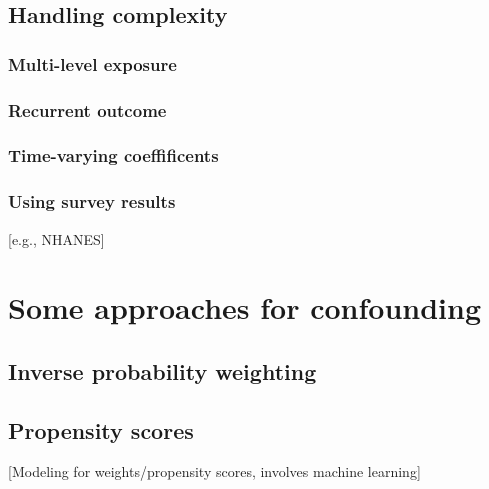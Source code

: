 \documentclass[
]{book}
\begin{document}
\hypertarget{handling-complexity}{%
\section{Handling complexity}\label{handling-complexity}}

\hypertarget{multi-level-exposure}{%
\subsection{Multi-level exposure}\label{multi-level-exposure}}

\hypertarget{recurrent-outcome}{%
\subsection{Recurrent outcome}\label{recurrent-outcome}}

\hypertarget{time-varying-coeffificents}{%
\subsection{Time-varying coeffificents}\label{time-varying-coeffificents}}

\hypertarget{using-survey-results}{%
\subsection{Using survey results}\label{using-survey-results}}

{[}e.g., NHANES{]}

\hypertarget{some-approaches-for-confounding}{%
\chapter{Some approaches for confounding}\label{some-approaches-for-confounding}}

\hypertarget{inverse-probability-weighting}{%
\section{Inverse probability weighting}\label{inverse-probability-weighting}}

\hypertarget{propensity-scores}{%
\section{Propensity scores}\label{propensity-scores}}

{[}Modeling for weights/propensity scores, involves machine learning{]}
\end{document}
